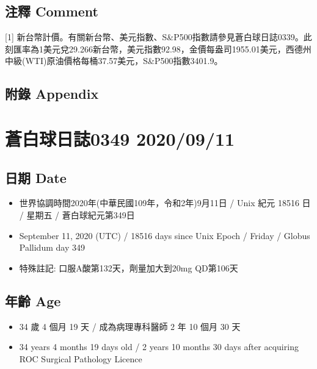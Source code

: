 \documentclass[a5paper, 11pt
]{book}
\providecommand{\tightlist}{%
  \setlength{\itemsep}{0pt}\setlength{\parskip}{0pt}}
\begin{document}
\hypertarget{ux6ce8ux91cb-comment-9}{%
\subsection{注釋 Comment}\label{ux6ce8ux91cb-comment-9}}

{[}1{]}
新台幣計價。有關新台幣、美元指數、S\&P500指數請參見蒼白球日誌0339。此刻匯率為1美元兌29.266新台幣，美元指數92.98，金價每盎司1955.01美元，西德州中級(WTI)原油價格每桶37.57美元，S\&P500指數3401.9。

\hypertarget{ux9644ux9304-appendix-9}{%
\subsection{附錄 Appendix}\label{ux9644ux9304-appendix-9}}

\hypertarget{ux84bcux767dux7403ux65e5ux8a8c0349-20200911}{%
\section{蒼白球日誌0349
2020/09/11}\label{ux84bcux767dux7403ux65e5ux8a8c0349-20200911}}

\hypertarget{ux65e5ux671f-date-10}{%
\subsection{日期 Date}\label{ux65e5ux671f-date-10}}

\begin{itemize}
\tightlist
\item
  世界協調時間2020年(中華民國109年，令和2年)9月11日 / Unix 紀元 18516 日
  / 星期五 / 蒼白球紀元第349日
\item
  September 11, 2020 (UTC) / 18516 days since Unix Epoch / Friday /
  Globus Pallidum day 349
\item
  特殊註記: 口服A酸第132天，劑量加大到20mg QD第106天
\end{itemize}

\hypertarget{ux5e74ux9f61-age-10}{%
\subsection{年齡 Age}\label{ux5e74ux9f61-age-10}}

\begin{itemize}
\tightlist
\item
  34 歲 4 個月 19 天 / 成為病理專科醫師 2 年 10 個月 30 天
\item
  34 years 4 months 19 days old / 2 years 10 months 30 days after
  acquiring ROC Surgical Pathology Licence
\end{itemize}
\end{document}
